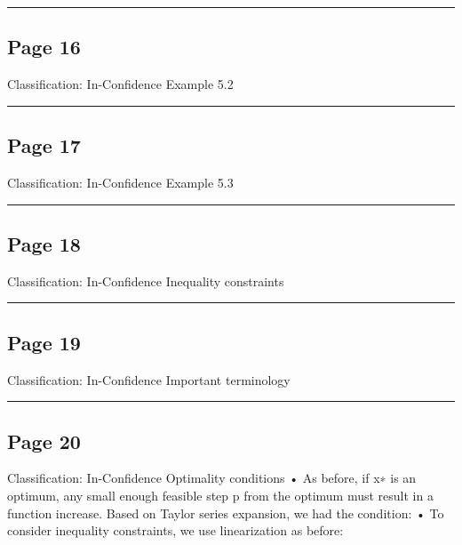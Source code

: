 \documentclass[
]{article}
\begin{document}
\begin{center}\rule{0.5\linewidth}{0.5pt}\end{center}

\subsection{Page 16}\label{page-16}

Classification: In-Confidence Example 5.2

\begin{center}\rule{0.5\linewidth}{0.5pt}\end{center}

\subsection{Page 17}\label{page-17}

Classification: In-Confidence Example 5.3

\begin{center}\rule{0.5\linewidth}{0.5pt}\end{center}

\subsection{Page 18}\label{page-18}

Classification: In-Confidence Inequality constraints

\begin{center}\rule{0.5\linewidth}{0.5pt}\end{center}

\subsection{Page 19}\label{page-19}

Classification: In-Confidence Important terminology

\begin{center}\rule{0.5\linewidth}{0.5pt}\end{center}

\subsection{Page 20}\label{page-20}

Classification: In-Confidence Optimality conditions • As before, if x∗
is an optimum, any small enough feasible step p from the optimum must
result in a function increase. Based on Taylor series expansion, we had
the condition: • To consider inequality constraints, we use
linearization as before:
\end{document}
